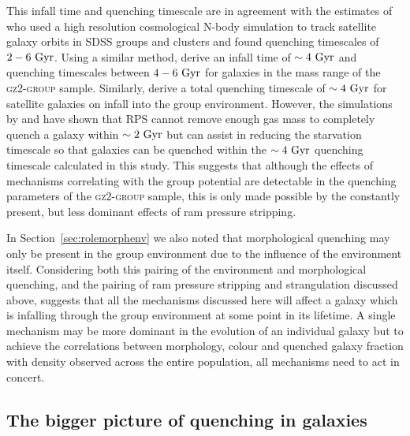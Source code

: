 \documentclass[useAMS,usenatbib]{mn2e}
\begin{document}
This infall time and quenching timescale are in agreement with the estimates of \cite{wetzel13} who used a high resolution cosmological N-body simulation to track satellite galaxy orbits in SDSS groups and clusters and found quenching timescales of $2-6~\rm{Gyr}$. Using a similar method, \cite{oman16} derive an infall time of $\sim4~\rm{Gyr}$ and quenching timescales between $4-6~\rm{Gyr}$ for galaxies in the mass range of the \textsc{gz2-group} sample. Similarly, \cite{hahn16} derive a total quenching timescale of $\sim4~\rm{Gyr}$ for satellite galaxies on infall into the group environment. However, the simulations by \cite{fillingham16} and \cite{emerick16} have shown that RPS cannot remove enough gas mass to completely quench a galaxy within $\sim2~\rm{Gyr}$ but can assist in reducing the starvation timescale so that galaxies can be quenched within the $\sim4~\rm{Gyr}$ quenching timescale calculated in this study. This suggests that although the effects of mechanisms correlating with the group potential are detectable in the quenching parameters of the \textsc{gz2-group} sample, this is only made possible by the constantly present, but less dominant effects of ram pressure stripping. 

In Section~\ref{sec:rolemorphenv} we also noted that morphological quenching may only be present in the group environment due to the influence of the environment itself. Considering both this pairing of the environment and morphological quenching, and the pairing of ram pressure stripping and strangulation discussed above, suggests that all the mechanisms discussed here will affect a galaxy which is infalling through the group environment at some point in its lifetime. A single mechanism may be more dominant in the evolution of an individual galaxy but to achieve the correlations between morphology, colour and quenched galaxy fraction with density observed across the entire population, all mechanisms need to act in concert.  

\subsection{The bigger picture of quenching in galaxies}\label{sec:bigpic}
\end{document}
